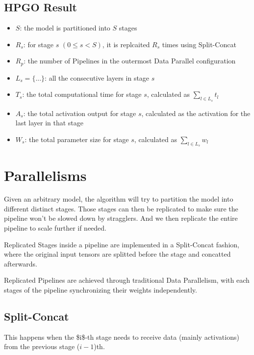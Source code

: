 \documentclass[11pt]{article}
\begin{document}
\subsection{HPGO Result}
\label{sec:orge4861be}
\begin{itemize}
\item \(S\): the model is partitioned into \(S\) stages
\item \(R_s\): for stage \(s\) \((0 \le s < S)\), it is replcaited \(R_s\) times using Split-Concat
\item \(R_p\): the number of Pipelines in the outermost Data Parallel configuration
\item \(L_s = \{...\}\): all the consecutive layers in stage \(s\)
\item \(T_s\): the total computational time for stage \(s\), calculated as \(\sum_{l \in L_s} {t_l}\)
\item \(A_s\): the total activation output for stage \(s\), calculated as the activation for the last layer in that stage
\item \(W_s\): the total parameter size for stage \(s\), calculated as \(\sum_{l \in L_s} w_l\)
\end{itemize}

\section{Parallelisms}
\label{sec:orgb2e1f9f}

Given an arbitrary model, the algorithm will try to partition the model into different distinct stages. Those stages can then be replicated to make sure the pipeline won't be slowed down by stragglers. And we then replicate the entire pipeline to scale further if needed. 

Replicated Stages inside a pipeline are implemented in a Split-Concat fashion, where the original input tensors are splitted before the stage and concatted afterwards. 

Replicated Pipelines are achieved through traditional Data Parallelism, with each stages of the pipeline synchronizing their weights independently.

\subsection{Split-Concat}
\label{sec:org44762d0}

This happens when the \$i\$-th stage needs to receive data (mainly activations) from the previous stage (\(i-1\))th. 
\end{document}
